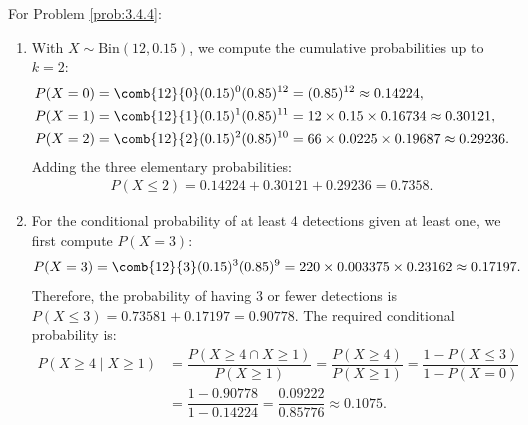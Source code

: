 \begin{solucion}
	\label{sol:3.4.4}
	For Problem \ref{prob:3.4.4}:
	\begin{enumerate}
		\item With $X \sim \text{Bin}(12, 0.15)$, we compute the cumulative probabilities up to $k=2$:
		\begin{align*}
			P(X = 0) &= \comb{12}{0} (0.15)^0 (0.85)^{12} = (0.85)^{12} \approx 0.14224, \\
			P(X = 1) &= \comb{12}{1} (0.15)^1 (0.85)^{11} = 12 \times 0.15 \times 0.16734 \approx 0.30121, \\
			P(X = 2) &= \comb{12}{2} (0.15)^2 (0.85)^{10} = 66 \times 0.0225 \times 0.19687 \approx 0.29236.
		\end{align*}
		Adding the three elementary probabilities:
		\begin{align*}
			P(X \le 2) = 0.14224 + 0.30121 + 0.29236 = 0.7358.
		\end{align*}
		\item For the conditional probability of at least $4$ detections given at least one, we first compute $P(X = 3)$:
		\begin{align*}
			P(X = 3) &= \comb{12}{3} (0.15)^3 (0.85)^9 = 220 \times 0.003375 \times 0.23162 \approx 0.17197.
		\end{align*}
		Therefore, the probability of having $3$ or fewer detections is $P(X \le 3) = 0.73581 + 0.17197 = 0.90778$. The required conditional probability is:
		\begin{align*}
			P(X \ge 4 \mid X \ge 1) &= \dfrac{P(X \ge 4 \cap X \ge 1)}{P(X \ge 1)} = \dfrac{P(X \ge 4)}{P(X \ge 1)} = \dfrac{1 - P(X \le 3)}{1 - P(X = 0)} \\
			&= \dfrac{1 - 0.90778}{1 - 0.14224} = \dfrac{0.09222}{0.85776} \approx 0.1075.
		\end{align*}
	\end{enumerate}
\end{solucion}


